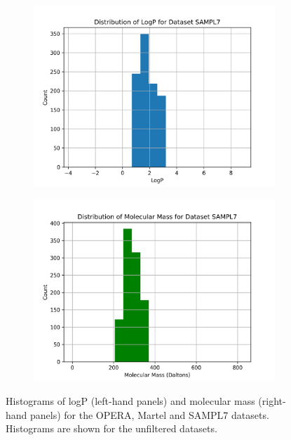 \documentclass{article}
\begin{document}
\begin{figure}
\bigskip %
\begin{subfigure}[t]{0.45\textwidth}
    \includegraphics[width=\linewidth]{./../plots/logp_distribution_SAMPL7.png}
\end{subfigure}\hspace{\fill} %
\begin{subfigure}[t]{0.45\textwidth}
    \includegraphics[width=\linewidth]{./../plots/molecular_mass_distribution_SAMPL7.png}
\end{subfigure}

\caption{Histograms of logP (left-hand panels) and molecular mass (right-hand panels) for the OPERA, Martel and SAMPL7 datasets. Histograms are shown for the unfiltered datasets.}
\label{figure1}
\end{figure}
\end{document}
